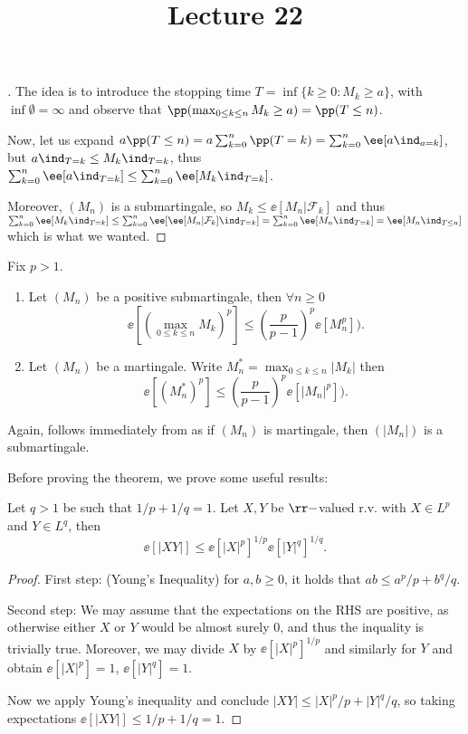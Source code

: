 \documentclass[../main.tex]{subfiles}
\title{Lecture 22}
\begin{document}
\begin{proof}[]
  The idea is to introduce the stopping time $T = \inf \{ k \geq 0 \colon M_k
  \geq a \} $, with $\inf \emptyset = \infty$ and observe that
  $\pp(\max_{0 \leq k \leq n} M_k \geq a) = \pp(T \leq n)$.

  Now, let us expand $a \pp(T \leq n) = a \sum_{k=0}^n  \pp(T = k) =
  \sum_{k=0}^n \ee[a \ind_{a = k}]$, but $a \ind_{T = k} \leq M_k \ind_{T =
  k}$, thus $\sum_{k=0}^n \ee[a \ind_{T = k}] \leq \sum_{k=0}^n \ee[M_k
  \ind_{T = k}]$.

  Moreover, $(M_n)$ is a submartingale, so $M_k \leq \ee[M_n | \mathcal{F}_k]$
  and thus $\sum_{k=0}^n \ee[M_k \ind_{T = k}] \leq \sum_{k=0}^n \ee[\ee[M_n |
  \mathcal{F}_k] \ind_{T = k}] = \sum_{k=0}^n \ee[M_n \ind_{T = k}] = \ee[M_n
  \ind_{T \leq n}]$ which is what we wanted.
\end{proof}

\begin{theorem}
  Fix $p > 1$.

  \begin{enumerate}
    \item Let $(M_n)$ be a positive submartingale, then $\forall n \geq 0$
      \[
        \ee[(\max_{0 \leq k \leq n} M_k)^p] \leq \left( \frac{p}{p-1}
        \right)^p \ee[M_n^p] )
      .\] 
    \item Let $(M_n)$ be a martingale. Write $M_n^* = \max_{0 \leq k \leq n}
      |M_k|$ then
      \[
        \ee[(M_n^*)^p] \leq \left( \frac{p}{p-1}
        \right)^p \ee[|M_n|^p] )
      .\] 
  \end{enumerate}
\end{theorem}
\begin{remark}
  Again,  follows immediately from  as if $(M_n)$ is
  martingale, then $(|M_n|)$ is a submartingale.
\end{remark}

Before proving the theorem, we prove some useful results:

\begin{lemma}
  Let $q > 1$ be such that $1/p + 1/q = 1$. Let $X, Y$ be $\rr-$valued r.v.
  with $X \in L^p$ and $Y \in L^q$, then
  \[
    \ee[|XY|] \leq \ee[|X|^p]^{1/p} \ee[|Y|^q]^{1/q} 
  .\] 
\end{lemma}
\begin{proof}
  First step: (Young's Inequality) for $a, b \geq 0$, it holds that $ab \leq a^p/p + b^q/q$.

    Second step: We may assume that the expectations on the RHS are positive,
    as otherwise either $X$ or $Y$ would be almost surely $0$, and thus the
    inquality is trivially true. Moreover, we may divide $X$ by
    $\ee[|X|^p]^{1/p}$ and similarly for $Y$ and obtain $\ee[|X|^p] = 1$,
    $\ee[|Y|^q] = 1$.

    Now we apply Young's inequality and conclude $|XY| \leq |X|^p/p +
    |Y|^q/q$, so taking expectations $\ee[|XY|] \leq 1/p + 1/q = 1$.
\end{proof}
\end{document}
